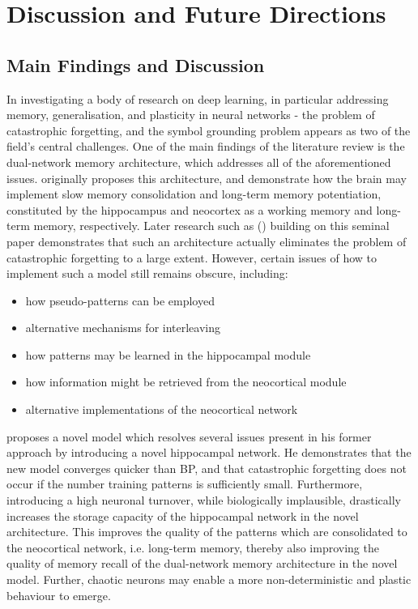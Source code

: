 
\chapter{Discussion and Future Directions}
\section{Main Findings and Discussion}


In investigating a body of research on deep learning, in particular addressing memory, generalisation, and plasticity in neural networks - the problem of catastrophic forgetting, and the symbol grounding problem appears as two of the field's central challenges. One of the main findings of the literature review is the dual-network memory architecture, which addresses all of the aforementioned issues. \cite{McClelland1995} originally proposes this architecture, and demonstrate how the brain may implement slow memory consolidation and long-term memory potentiation, constituted by the hippocampus and neocortex as a working memory and long-term memory, respectively. Later research such as (\cite{French1997, Ans1997, Ans2000, French2001, Hattori2010, Hattori2014}) building on this seminal paper demonstrates that such an architecture actually eliminates the problem of catastrophic forgetting to a large extent. However, certain issues of how to implement such a model still remains obscure, including:
\begin{itemize}
\item how pseudo-patterns can be employed
\item alternative mechanisms for interleaving
\item how patterns may be learned in the hippocampal module
\item how information might be retrieved from the neocortical module
\item alternative implementations of the neocortical network
\end{itemize}

\cite{Hattori2014} proposes a novel model which resolves several issues present in his former approach by introducing a novel hippocampal network. He demonstrates that the new model converges quicker than BP, and that catastrophic forgetting does not occur if the number training patterns is sufficiently small. Furthermore, introducing a high neuronal turnover, while biologically implausible, drastically increases the storage capacity of the hippocampal network in the novel architecture. This improves the quality of the patterns which are consolidated to the neocortical network, i.e. long-term memory, thereby also improving the quality of memory recall of the dual-network memory architecture in the novel model. Further, chaotic neurons may enable a more non-deterministic and plastic behaviour to emerge.

